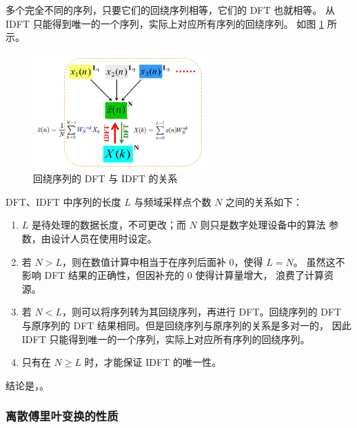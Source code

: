 \begin{remark}
    多个完全不同的序列，只要它们的回绕序列相等，它们的 DFT 也就相等。
    从 IDFT 只能得到唯一的一个序列，实际上对应所有序列的回绕序列。
    如图 \ref{fig:wrapped_sequence_relation} 所示。
    \begin{figure}[H]
        \centering
        \includegraphics[width = 0.6\textwidth]{chap3/img/wrapped_sequence_relation.png}
        \caption{回绕序列的 DFT 与 IDFT 的关系}
        \label{fig:wrapped_sequence_relation}
    \end{figure}
\end{remark}

\begin{corollary}[$N$ 与 $L$ 的关系]
    DFT、IDFT 中序列的长度 $L$ 与频域采样点个数 $N$ 之间的关系如下：
    \begin{enumerate}[label=(\arabic*)]
        \item $L$ 是待处理的数据长度，不可更改；而 $N$ 则只是数字处理设备中的算法
            参数，由设计人员在使用时设定。
        \item 若 $N > L$，则在数值计算中相当于在序列后面补 $0$，使得 $L = N$。
            虽然这不影响 DFT 结果的正确性，但因补充的 $0$ 使得计算量增大，
            浪费了计算资源。
        \item 若 $N < L$，则可以将序列转为其回绕序列，再进行 DFT。回绕序列的 DFT
            与原序列的 DFT 结果相同。但是回绕序列与原序列的关系是多对一的，
            因此 IDFT 只能得到唯一的一个序列，实际上对应所有序列的回绕序列。
        \item 只有在 $N \ge L$ 时，才能保证 IDFT 的唯一性。
    \end{enumerate}
    结论是，。
\end{corollary}

\subsubsection{离散傅里叶变换的性质}

